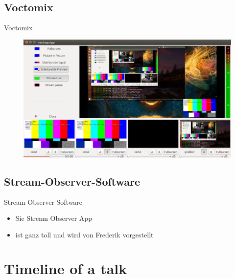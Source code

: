 \documentclass[hyperref={pdfpagelabels=false}]{beamer}
\begin{document}
\subsection{Voctomix} %
\begin{frame}{Voctomix}
	\begin{figure} 
		\centering
		\includegraphics[width=1\textwidth]{voctomix.png}
	\end{figure}
\end{frame}


\subsection{Stream-Observer-Software} %
\begin{frame}{Stream-Observer-Software}
\begin{itemize}
\item Sie Stream Observer App 
\item ist ganz toll und wird von Frederik vorgestellt
\end{itemize}
\end{frame}

\section{Timeline of a talk} 
\end{document}
